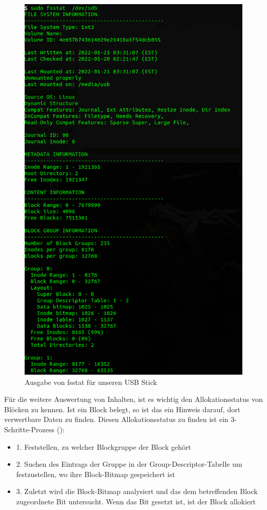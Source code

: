 \begin{figure}[H]
	\centering
	\includegraphics[width=12cm,keepaspectratio=true]{pictures/fsstat.png}
	\caption{
		Ausgabe von fsstat für unseren USB Stick
	}
	\label{fig:fsstat}
\end{figure}

Für die weitere Auswertung von Inhalten, ist es wichtig den Allokationsstatus von Blöcken zu kennen. Ist ein Block belegt, so ist das ein Hinweis darauf, dort verwertbare Daten zu finden. Diesen Allokationsstatus zu finden ist ein 3-Schritte-Prozess (\cite{Carrier.06.01.2022}):

\begin{itemize}
	\item 1. Feststellen, zu welcher Blockgruppe der Block gehört
	\item 2. Suchen des Eintrags der Gruppe in der Group-Descriptor-Tabelle um festzustellen, wo ihre Block-Bitmap gespeichert ist
	\item 3. Zuletzt wird die Block-Bitmap analysiert und das dem betreffenden Block zugeordnete Bit untersucht. Wenn das Bit gesetzt ist, ist der Block allokiert
\end{itemize}

